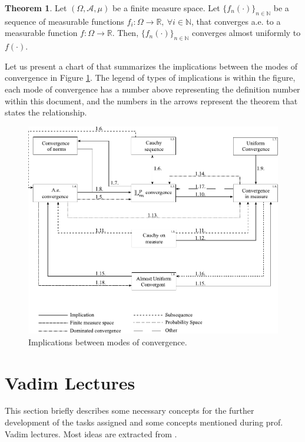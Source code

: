 \documentclass[11pt,letterpaper]{article}
\newcommand{\NN}{{\mathbb{N}}}
\newcommand{\RR}{{\mathbb{R}}}
\newcommand{\A}{{\mathcal{A}}}
\theoremstyle{definition}
\newtheorem{theorem}{Theorem}[section]
\begin{document}
\begin{theorem}
Let $(\Omega,\A, \mu)$ be a finite measure space. Let $\{f_n(\cdot)\}_{n\in\NN}$ be a sequence of measurable functions $f_i:\Omega\rightarrow\RR, \ \forall i\in\NN$, that converges a.e. to a measurable function $f:\Omega\rightarrow\RR$. Then, $\{f_n(\cdot)\}_{n\in\NN}$ converges almost uniformly to $f(\cdot)$.
\end{theorem}

Let us present a chart of that summarizes the implications between the modes of convergence in Figure \ref{fig:chart}. The legend of types of implications is within the figure, each mode of convergence has a number above representing the definition number within this document, and the numbers in the arrows represent the theorem that states the relationship.

\begin{figure}[ht]
    \centering
    \includegraphics[width=\textwidth]{figs/diag_mc.pdf}
    \caption{Implications between modes of convergence.}
    \label{fig:chart}
\end{figure}


\section{Vadim Lectures}
This section briefly describes some necessary concepts for the further development of the tasks assigned and some concepts mentioned during prof. Vadim lectures. Most ideas are extracted from \cite{azhmyakov2011approximability}.
\end{document}
